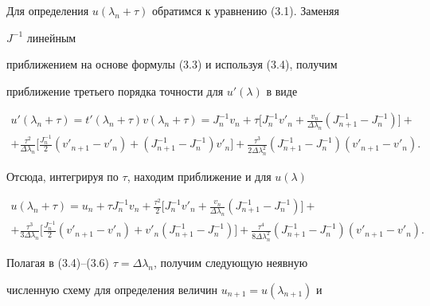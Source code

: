  


Для определения $u(\lambda_n+\tau)$ обратимся к уравнению (3.1). Заменяя 


$J^{-1}$ линейным 


приближением на основе формулы (3.3) и используя (3.4), получим 


приближение третьего порядка точности для $u'(\lambda)$ в виде 


\begin{multline*} 


u'(\lambda_n+\tau)=t'(\lambda_n+\tau)v(\lambda_n+\tau)= 


J^{-1}_n v_n+\tau\bigg[J^{-1}_n v'_n+ 


\frac{v_n}{\Delta\lambda_n}(J^{-1}_{n+1}-J^{-1}_n)\bigg]+\\ 


% 


+\frac{\tau^2}{\Delta\lambda_n}\bigg[\frac{J^{-1}_n}{2} 


(v'_{n+1}-v'_n)+(J^{-1}_{n+1}-J^{-1}_n)v'_n\bigg]+ 


\frac{\tau^3}{2\Delta\lambda_n^2}(J^{-1}_{n+1}-J^{-1}_n) 


(v'_{n+1}-v'_n). 


\end{multline*} 


Отсюда, интегрируя по $\tau$, находим приближение и для $u(\lambda)$ 


\begin{multline} 


u(\lambda_n+\tau)=u_n+\tau J^{-1}_n v_n+\frac{\tau^2}{2}\bigg[ 


J^{-1}_n v'_n+\frac{v_n}{\Delta\lambda_n}(J^{-1}_{n+1}-J^{-1}_n) 


\bigg]+ \\ 


% 


+\frac{\tau^3}{3\Delta\lambda_n}\bigg[\frac{J^{-1}_n}{2} 


(v'_{n+1}-v'_n)+v'_n(J^{-1}_{n+1}-J^{-1}_n)\bigg] 


+\frac{\tau^4}{8\Delta\lambda_n^2}(J^{-1}_{n+1}-J^{-1}_n) 


(v'_{n+1}-v'_n). 


\end{multline} 


 


Полагая в (3.4)--(3.6) $\tau=\Delta\lambda_n$, получим следующую неявную 


численную схему для определения величин $u_{n+1}=u(\lambda_{n+1})$ и 



